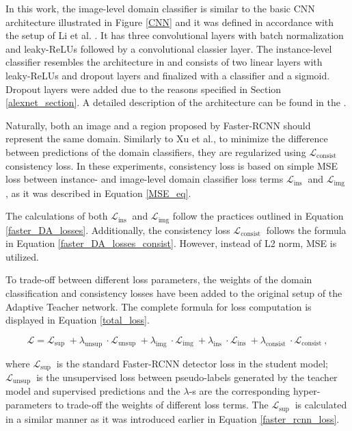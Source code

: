 In this work, the image-level domain classifier is similar to the basic CNN architecture illustrated in Figure \ref{CNN} and it was defined in accordance with the setup of Li et al. \cite{Li2021}. It has three convolutional layers with batch normalization and leaky-ReLUs followed by a convolutional classier layer. The instance-level classifier resembles the architecture in \cite{Xu2020} and consists of two linear layers with leaky-ReLUs and dropout layers and finalized with a classifier and a sigmoid. Dropout layers were added due to the reasons specified in Section \ref{alexnet_section}. A detailed description of the architecture can be found in the . 

Naturally, both an image and a region proposed by Faster-RCNN should represent the same domain. Similarly to Xu et al., to minimize the difference between predictions of the domain classifiers, they are regularized using $\mathcal{L}_{\text {consist }}$ consistency loss. In these experiments, consistency loss is based on simple MSE loss between instance- and image-level domain classifier loss terms $\mathcal{L}_{\text {ins }}$ and $\mathcal{L}_{\text {img }}$, as it was described in Equation \ref{MSE_eq}.

The calculations of both $\mathcal{L}_{\text {ins }}$ and $\mathcal{L}_{\text {img}}$ follow the practices outlined in Equation \ref{faster_DA_losses}. Additionally,  the consistency loss $\mathcal{L}_{\text {consist }}$ follows the formula in Equation \ref{faster_DA_losses_consist}. However, instead of L2 norm, MSE is utilized.  

To trade-off between different loss parameters, the weights of the domain classification and consistency losses have been added to the original setup of the Adaptive Teacher network. The complete formula for loss computation is displayed in Equation \ref{total_loss}. 

\begin{equation}
\mathcal{L}=\mathcal{L}_{\text {sup }}+\lambda_{\text {unsup }} \cdot \mathcal{L}_{\text {unsup }}+\lambda_{\text {img }} \cdot \mathcal{L}_{\text {img }}+\lambda_{\text {ins }} \cdot \mathcal{L}_{\text {ins }}+\lambda_{\text {consist }} \cdot \mathcal{L}_{\text {consist }},
\label{total_loss} 
\end{equation}

where $\mathcal{L}_{\text {sup }}$ is the standard Faster-RCNN detector loss in the student model; $\mathcal{L}_{\text {unsup }}$ is the unsupervised loss between pseudo-labels generated by the teacher model and supervised predictions and the $\lambda$-s are the corresponding hyper-parameters to trade-off the weights of different loss terms. The $\mathcal{L}_{\text {sup }}$ is calculated in a similar manner as it was introduced earlier in Equation \ref{faster_rcnn_loss}. 
 

